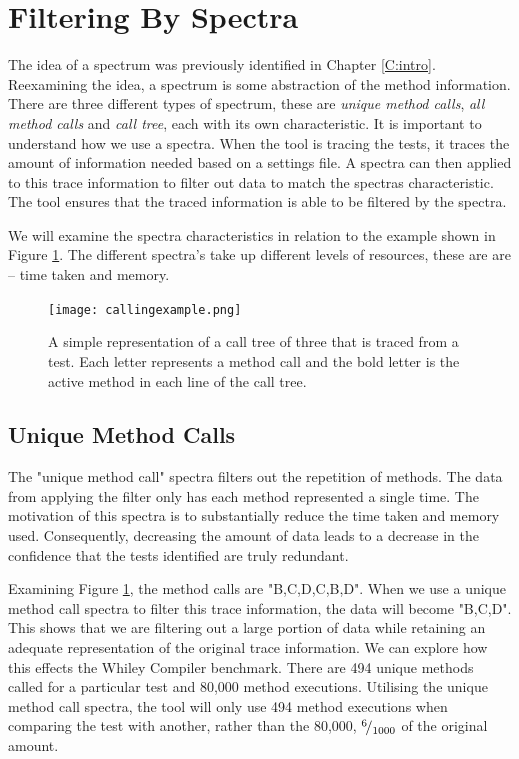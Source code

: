 \section{Filtering By Spectra }
\label{S:spectra}
The idea of a spectrum was previously identified in Chapter \ref{C:intro}. Reexamining the idea, a spectrum is some abstraction of the method information. There are three different types of spectrum, these are \textit{unique method calls}, \textit{all method calls} and \textit{call tree}, each with its own characteristic. It is important to understand how we use a spectra. When the tool is tracing the tests, it traces the amount of information needed based on a settings file. A spectra can then applied to this trace information to filter out data to match the spectras characteristic. The tool ensures that the traced information is able to be filtered by the spectra. 

We will examine the spectra characteristics in relation to the example shown in Figure \ref{fig:callingexample}. The different spectra's take up different levels of resources, these are are -- time taken and memory. 


\begin{figure}[h]
\begin{center}
\texttt{[image: callingexample.png]}
\end{center}
\caption{A simple representation of a call tree of three that is traced from a test. Each letter represents a method call and the bold letter is the active method in each line of the call tree.}
\label{fig:callingexample}
\end{figure}

\subsection{Unique Method Calls}
The "unique method call" spectra filters out the repetition of methods. The data from applying the filter only has each method represented a single time. The motivation of this spectra is to substantially reduce the time taken and memory used. Consequently, decreasing the amount of data leads to a decrease in the confidence that the tests identified are truly redundant. 

Examining Figure \ref{fig:callingexample}, the method calls are "B,C,D,C,B,D". When we use a unique method call spectra to filter this trace information, the data will become "B,C,D". This shows that we are filtering out a large portion of data while retaining an adequate representation of the original trace information. We can explore how this effects the Whiley Compiler benchmark. There are 494 unique methods called for a particular test and 80,000 method executions. Utilising the unique method call spectra, the tool will only use 494 method executions when comparing the test with another, rather than the 80,000, ${}^{6}\!/_{1000}$ of the original amount. 


